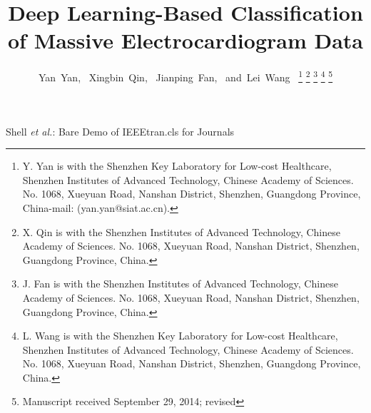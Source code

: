 \documentclass[journal]{IEEEtran}
\begin{document}
%
\title{Deep Learning-Based Classification of Massive Electrocardiogram Data}
%
%
%

\author{Yan~Yan,~
        Xingbin~Qin,~
        Jianping~Fan,~
        and~Lei~Wang~%
\thanks{Y. Yan is with the Shenzhen Key Laboratory for Low-cost Healthcare, Shenzhen Institutes of Advanced Technology, Chinese Academy of Sciences. No. 1068, Xueyuan Road, Nanshan District,
Shenzhen, Guangdong Province, China-mail: (yan.yan@siat.ac.cn).}%
\thanks{X. Qin is with the Shenzhen Institutes of Advanced Technology, Chinese Academy of Sciences.
No. 1068, Xueyuan Road, Nanshan District, Shenzhen, Guangdong Province, China.}%
\thanks{J. Fan is with the Shenzhen Institutes of Advanced Technology, Chinese Academy of Sciences. No. 1068, Xueyuan Road, Nanshan District, Shenzhen, Guangdong Province, China.}%
\thanks{L. Wang is with the Shenzhen Key Laboratory for Low-cost Healthcare, Shenzhen Institutes of Advanced Technology, Chinese Academy of Sciences.
No. 1068, Xueyuan Road, Nanshan District,
Shenzhen, Guangdong Province, China.}%
\thanks{Manuscript received September 29, 2014; revised}}


%
{Shell \MakeLowercase{\textit{et al.}}: Bare Demo of IEEEtran.cls for Journals}


\maketitle
\end{document}
